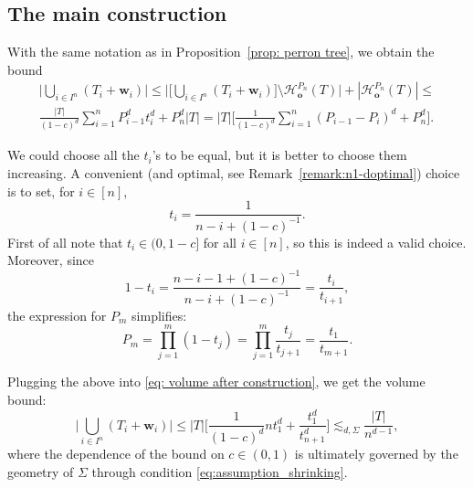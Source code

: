 \documentclass[10pt]{amsart}
\begin{document}
\subsection{The main construction}
With the same notation as in Proposition~\ref{prop: perron tree}, we obtain the bound
\begin{multline}\label{eq: volume after construction}
    \bigg|\bigcup_{i\in I^n} (T_i+\mathbf{w}_i)\bigg|\leq\bigg|\bigg[\bigcup_{i\in I^n} (T_i+\mathbf{w}_i)\bigg]\setminus \mathcal{H}_\mathbf{o}^{P_n}(T)\bigg|+|\mathcal{H}_\mathbf{o}^{P_n}(T)|\leq\\ \frac{|T|}{(1-c)^d}\sum_{i=1}^n P_{i-1}^d t_{i}^d+P_n^d|T|
    =|T|\bigg[\frac{1}{(1-c)^d}\sum_{i=1}^n(P_{i-1} - P_i)^d+P_n^d\bigg].
\end{multline}

We could choose all the $t_i$'s to be equal, but it is better to choose them increasing. A convenient (and optimal, see Remark~\ref{remark:n1-doptimal}) choice is to set, for $i\in[n]$,
\begin{equation}\label{eq: specific ti}
    t_i=\frac{1}{n-i+(1-c)^{-1}}.
\end{equation}
First of all note that $t_i\in (0,1-c]$ for all $i\in [n]$, so this is indeed a valid choice. Moreover, since
\begin{equation*}
    1-t_i=\frac{n-i-1+(1-c)^{-1}}{n-i+(1-c)^{-1}} = \frac{t_i}{t_{i+1}},
\end{equation*}
the expression for $P_m$ simplifies:
\begin{equation*}
   P_m= \prod_{j=1}^m (1-t_j)  = \prod_{j=1}^m \frac{t_j}{t_{j+1}}= \frac{t_1}{t_{m+1}}.    
\end{equation*}

Plugging the above into \eqref{eq: volume after construction}, we get the volume bound:
\begin{equation*}
     \bigg|\bigcup_{i\in I^n} (T_i+\mathbf{w}_i)\bigg|\leq |T|\bigg[
     \frac{1}{(1-c)^d} n t_1^d + \frac{t_1^d}{t_{n+1}^d}
     \bigg]\lesssim_{d,\Sigma}\frac{|T|}{n^{d-1}},
\end{equation*}
where the dependence of the bound on $c\in (0,1)$ is ultimately governed by the geometry of $\Sigma$ through condition \eqref{eq:assumption_shrinking}.
\end{document}
